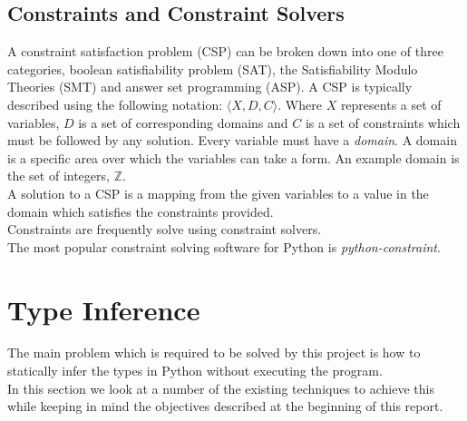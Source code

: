 \documentclass[12pt, titlepage]{article}
\begin{document}
\subsection{Constraints and Constraint Solvers}
A  constraint satisfaction problem (CSP) can be broken down into one of three categories, boolean satisfiability problem (SAT), the Satisfiability Modulo Theories (SMT) and answer set programming (ASP). A CSP is typically described using the following notation: $\langle X, D, C \rangle$. Where $X$ represents a set of variables, $D$ is a set of corresponding domains and $C$ is a set of constraints which must be followed by any solution. Every variable must have a \textit{domain}. A domain is a specific area over which the variables can take a form. An example domain is the set of integers, $\mathbb{Z}$. \\
A solution to a CSP is a mapping from the given variables to a value in the domain which satisfies the constraints provided. \\
Constraints are frequently solve using constraint solvers. \\
The most popular constraint solving software for Python is \textit{python-constraint}.

\newpage
\section{Type Inference}
The main problem which is required to be solved by this project is how to statically infer the types in Python without executing the program. \\
In this section we look at a number of the existing techniques to achieve this while keeping in mind the objectives described at the beginning of this report.
\end{document}
